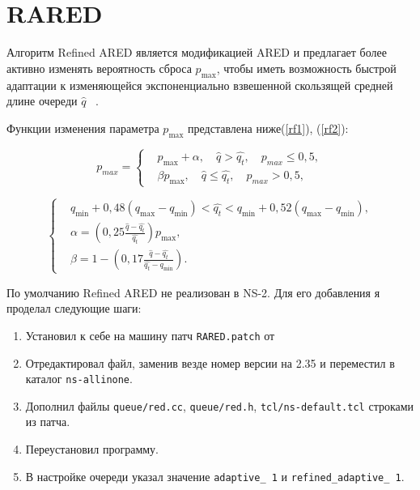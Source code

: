 \section{RARED}
\label{chap2:sec11}


Алгоритм Refined ARED является модификацией
ARED и предлагает более активно изменять вероятность сброса $p_{\max}$,
чтобы иметь возможность быстрой адаптации к изменяющейся
экспоненциально взвешенной скользящей средней длине очереди $\hat{q}$ ~\cite{RARED}.

Функции изменения параметра $p_{\max}$ представлена ниже(\ref{rf1}), (\ref{rf2}):

\begin{equation}
\label{rf1}
p_{max} = \left\{
  \begin{aligned}
& p_{\max}+\alpha, \quad  \hat{q}>\hat{q_{t}}, \quad p_{max} \leqslant 0,5, \\
& \beta p_{\max}, \quad \hat{q}\leqslant\hat{q_{t}}, \quad p_{max} > 0,5,
  \end{aligned}
\right.
\end{equation}

\begin{equation}
\label{rf2}
\left\{
  \begin{aligned}
    & q_{\min}+0,48\left(q_{\max}-q_{\min}\right) < \hat{q_t} < q_{\min}+0,52\left(q_{\max}-q_{\min}\right), \\
    & \alpha=\left(0,25\frac{\hat{q}-\hat{q_t}}{\hat{q_t}} \right)p_{\max}, \\ 
    & \beta=1-\left(0,17\frac{\hat{q}-\hat{q_t}}{\hat{q_t}-q_{\min}}\right).
  \end{aligned}
\right.
\end{equation}


По умолчанию Refined ARED не реализован в NS-2. Для его добавления я
проделал следующие шаги:

\begin{enumerate}
\item Установил к себе на машину патч \verb|RARED.patch| от 
\item Отредактировал файл, заменив везде номер версии на 2.35 и переместил в каталог \verb|ns-allinone|.
\item Дополнил файлы \verb|queue/red.cc|, \verb|queue/red.h|, \verb|tcl/ns-default.tcl| строками из патча.
\item Переустановил программу.
\item В настройке очереди указал значение \verb|adaptive_ 1| и 
\verb|refined_adaptive_ 1|.
\end{enumerate}
 
